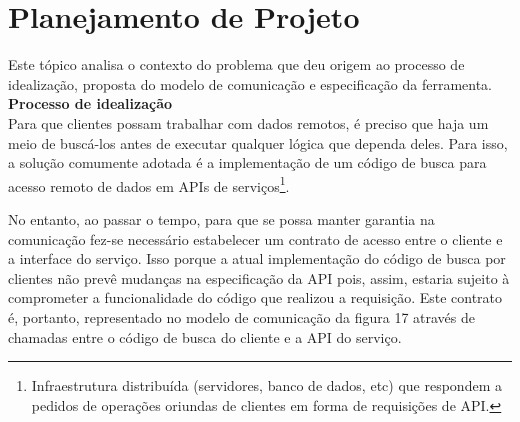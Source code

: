 \section{Planejamento de Projeto}

Este tópico analisa o contexto do problema que deu origem ao processo de idealização, proposta do modelo de comunicação e especificação da ferramenta. \\

\textbf{Processo de idealização} \\

Para que clientes possam trabalhar com dados remotos, é preciso que haja um meio de buscá-los antes de executar qualquer lógica que dependa deles. Para isso, a solução comumente adotada é a implementação de um código de busca para acesso remoto de dados em APIs de serviços\footnote{
  Infraestrutura distribuída (servidores, banco de dados, etc) que respondem a pedidos de operações oriundas de clientes em forma de requisições de API.
}.

No entanto, ao passar o tempo, para que se possa manter garantia na comunicação fez-se necessário estabelecer um contrato de acesso entre o cliente e a interface do serviço. Isso porque a atual implementação do código de busca por clientes não prevê mudanças na especificação da API pois, assim, estaria sujeito à comprometer a funcionalidade do código que realizou a requisição. Este contrato é, portanto, representado no modelo de comunicação da figura 17 através de chamadas entre o código de busca do cliente e a API do serviço.

